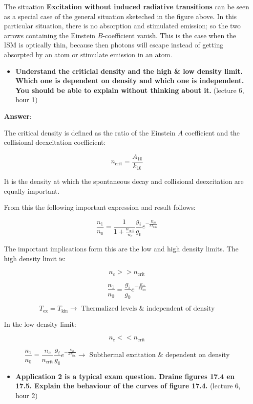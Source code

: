 \documentclass[11pt]{article}
\providecommand{\tightlist}{%
      \setlength{\itemsep}{0pt}\setlength{\parskip}{0pt}}
\begin{document}
The situation \textbf{Excitation without induced radiative transitions}
can be seen as a special case of the general situation sketeched in the
figure above. In this particular situation, there is no absorption and
stimulated emission; so the two arrows containing the Einstein
\(B\)-coefficient vanish. This is the case when the ISM is optically
thin, because then photons will escape instead of getting absorpted by
an atom or stimulate emission in an atom.

    \begin{itemize}
\tightlist
\item
  \textbf{Understand the criticial density and the high \& low density
  limit. Which one is dependent on density and which one is independent.
  You should be able to explain without thinking about it.} (lecture 6,
  hour 1)
\end{itemize}

\textbf{Answer}:

The critical density is defined as the ratio of the Einstein \(A\)
coefficient and the collisional deexcitation coefficient:

\[ n_\text{crit} = \frac{A_{10}}{k_{10}} \]

It is the density at which the spontaneous decay and collisional
deexcitation are equally important.

From this the following important expression and result follows:

\[ \frac{n_1}{n_0} = \frac{1}{1 + \frac{n_\text{crit}}{n_c}} \frac{g_i}{g_0} e^{-\frac{E_{10}}{kT_\text{kin}}} \]

The important implications form this are the low and high density
limits. The high density limit is:

\[ n_c >> n_\text{crit} \]

\[ \frac{n_1}{n_0} = \frac{g_i}{g_0} e^{-\frac{E_{10}}{kT_\text{kin}}} \]

\[ T_\text{ex} = T_\text{kin} \rightarrow \text{ Thermalized levels & independent of density} \]

In the low density limit:

\[ n_c << n_\text{crit} \]

\[ \frac{n_1}{n_0} = \frac{n_c}{n_\text{crit}} \frac{g_i}{g_0} e^{-\frac{E_{10}}{kT_\text{kin}}} \rightarrow \text{ Subthermal excitation & dependent on density} \]

    \begin{itemize}
\tightlist
\item
  \textbf{Application 2 is a typical exam question. Draine figures 17.4
  en 17.5. Explain the behaviour of the curves of figure 17.4.} (lecture
  6, hour 2)
\end{itemize}
\end{document}
